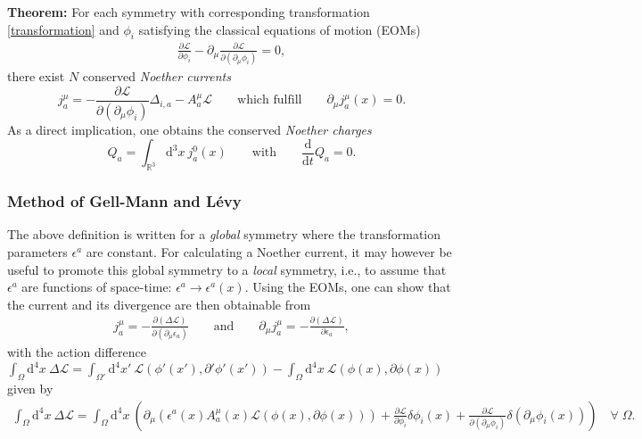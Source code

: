 \documentclass[prd,%
,superscriptaddress,%
nofootinbib,%
tightenlines ]{revtex4}
\newcommand{\dd}{\mathrm{d}}
\begin{document}
\textbf{Theorem:} For each symmetry with corresponding transformation \eqref{transformation} and $\phi_i$ satisfying the classical equations of motion (EOMs)
\begin{align}
	\frac{\partial \mathcal{L}}{\partial \phi_i} - \partial_\mu \frac{\partial \mathcal{L}}{\partial(\partial_\mu \phi_i)} = 0,
\end{align}
there exist $N$ conserved \textit{Noether currents}
\begin{equation}
	\label{eq:noether_current}
	j^\mu_a = -\frac{\partial \mathcal{L}}{\partial (\partial_\mu \phi_i)} \Delta_{i,a} - A^\mu_a \mathcal{L} \qquad \text{which fulfill} \qquad \partial_\mu j^\mu_a (x) = 0 .
\end{equation}
As a direct implication, one obtains the conserved \textit{Noether charges}
\begin{equation}
	Q_a = \int_{\mathbb{R}^3} \dd^3 x \: j^0_a (x) \qquad \text{with} \qquad \frac{\dd}{\dd t} Q_a = 0 .
\end{equation}

\subsubsection*{Method of Gell-Mann and L\'evy}

The above definition is written for a \textit{global} symmetry where the transformation parameters $\epsilon^a$ are constant.
For calculating a Noether current, it may however be useful to promote this global symmetry to a \textit{local} symmetry, i.e., to assume that $\epsilon^a$ are functions of space-time: $\epsilon^a \rightarrow \epsilon^a(x)$.
Using the EOMs, one can show that the current and its divergence are then obtainable from
\begin{align}
	\label{eq:gell-mann_levy}
	j^\mu_a = -\frac{\partial(\Delta \mathcal{L})}{\partial(\partial_\mu \epsilon_a)}
	\qquad \text{and} \qquad
	\partial_\mu j^\mu_a = -\frac{\partial(\Delta \mathcal{L})}{\partial \epsilon_a} ,
\end{align}
with the action difference $\int_\Omega \dd^4 x \: \Delta \mathcal{L} = \int_{\Omega'} \dd^4 x' \: \mathcal{L}(\phi'(x'), \partial' \phi'(x')) - \int_\Omega \dd^4 x \: \mathcal{L}(\phi(x), \partial \phi(x))$ given by
\begin{align}
	\int_\Omega \dd^4 x \: \Delta \mathcal{L} = \int_\Omega \dd^4 x \: \left( \partial_\mu( \epsilon^a(x) A^\mu_a(x) \mathcal{L}(\phi(x), \partial \phi(x)) )
	+ \frac{\partial \mathcal{L}}{\partial \phi_i} \delta \phi_i(x)
	+ \frac{\partial \mathcal{L}}{\partial(\partial_\mu \phi_i)} \delta(\partial_\mu \phi_i(x)) \right)
	\quad \forall \; \Omega.
\end{align}
\end{document}
